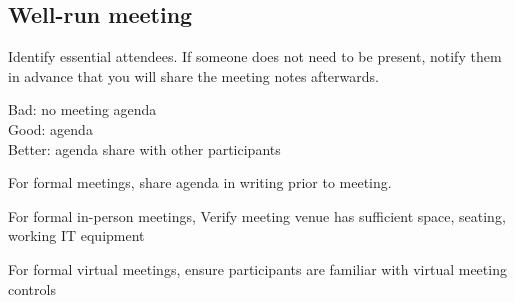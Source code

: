 \subsection{Well-run meeting\label{well-run_meeting}}

Identify essential attendees. If someone does not need to be present, notify them in advance that you will share the meeting notes afterwards. 


Bad: no meeting agenda\\
Good: agenda\\
Better: agenda share with other participants



For formal meetings, share agenda in writing prior to meeting. 

For formal in-person meetings, Verify meeting venue has sufficient space, seating, working IT equipment

For formal virtual meetings, ensure participants are familiar with virtual meeting controls

